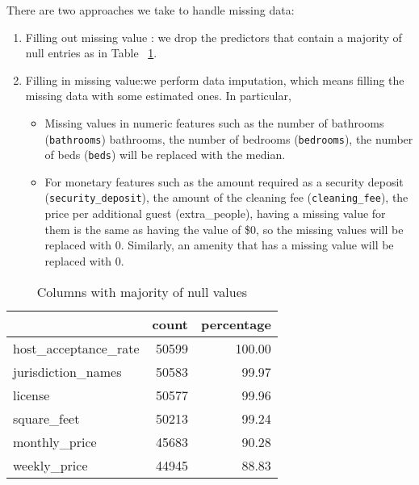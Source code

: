 There are two approaches we take to handle missing
data:
\begin{enumerate}
    \item Filling out missing value :  we drop the predictors
        that contain a majority of null entries as in Table
        ~\ref{tab:missing-value}.
    \item Filling in missing value:we perform data imputation, which means
        filling the missing data with some estimated ones. In particular,

        \begin{itemize}

            \item Missing values in numeric features such as the number of
                bathrooms (\texttt{bathrooms}) bathrooms, the number of bedrooms
                (\texttt{bedrooms}), the number of beds (\texttt{beds}) will be
                replaced with the median.

            \item For monetary features such as the amount required as a
                security deposit (\texttt{security\_deposit}), the amount of the cleaning
                fee (\texttt{cleaning\_fee}), the price per additional guest
                (extra\_people), having a missing value for them is the same as
                having the value of \$0, so the missing values will be replaced
                with 0. Similarly, an amenity that has a missing value will be replaced with 0.

        \end{itemize}
\end{enumerate}

\begin{table}[htp]
    \centering
    \caption{Columns with majority of null values}
    \label{tab:missing-value}
{\small
\begin{tabular}{lrr}
\toprule
{} &  count &  percentage \\
\midrule
host\_acceptance\_rate &  50599 &      100.00 \\
jurisdiction\_names   &  50583 &       99.97 \\
license              &  50577 &       99.96 \\
square\_feet          &  50213 &       99.24 \\
monthly\_price        &  45683 &       90.28 \\
weekly\_price         &  44945 &       88.83 \\
\bottomrule
\end{tabular}
}
\end{table}

